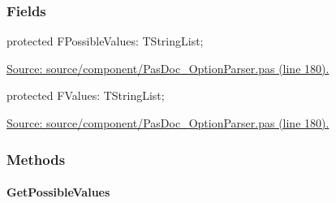 \documentclass{report}
\newif\ifpdf
\begin{document}
\subsubsection*{\large{\textbf{Fields}}\normalsize\hspace{1ex}\hfill}
\begin{list}{}{
\setlength{\itemindent}{0cm}
\setlength{\listparindent}{0cm}
\setlength{\leftmargin}{\evensidemargin}
\addtolength{\leftmargin}{\tmplength}
\settowidth{\labelsep}{X}
\addtolength{\leftmargin}{\labelsep}
\setlength{\labelwidth}{\tmplength}
}
\label{PasDoc_OptionParser.TSetOption-FPossibleValues}
\item[\textbf{FPossibleValues}\hfill]
\ifpdf
\begin{flushleft}
\fi
\begin{ttfamily}
protected FPossibleValues: TStringList;\end{ttfamily}

\ifpdf
\end{flushleft}
\fi


\par  \par
\href{https://github.com/pasdoc/pasdoc/blob/master/source/component/PasDoc_OptionParser.pas#L180}{Source: source/component/PasDoc{\_}OptionParser.pas (line 180).}\label{PasDoc_OptionParser.TSetOption-FValues}
\item[\textbf{FValues}\hfill]
\ifpdf
\begin{flushleft}
\fi
\begin{ttfamily}
protected FValues: TStringList;\end{ttfamily}

\ifpdf
\end{flushleft}
\fi


\par  \par
\href{https://github.com/pasdoc/pasdoc/blob/master/source/component/PasDoc_OptionParser.pas#L180}{Source: source/component/PasDoc{\_}OptionParser.pas (line 180).}\end{list}
\subsubsection*{\large{\textbf{Methods}}\normalsize\hspace{1ex}\hfill}
\paragraph*{GetPossibleValues}\hspace*{\fill}
\end{document}
